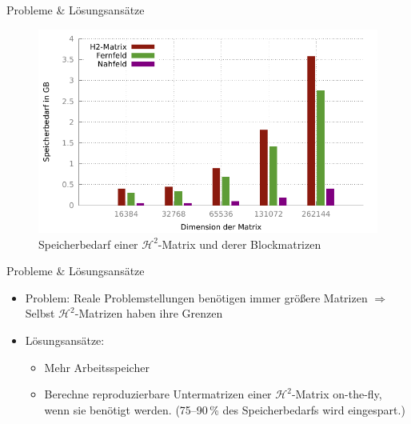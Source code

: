 \documentclass[10pt]{beamer}
\begin{document}
\begin{frame}{Probleme \& Lösungsansätze}
  \begin{figure}
    \includegraphics[width=\linewidth]{figures/fg-memory-h2-nf-ff.pdf}
    \caption{Speicherbedarf einer \(\mathcal{H}^2\)-Matrix und derer 
             Blockmatrizen}
  \end{figure}
\end{frame}

\begin{frame}{Probleme \& Lösungsansätze}
  \begin{itemize}
    \item Problem: Reale Problemstellungen benötigen immer größere Matrizen
          \(\Rightarrow\) Selbst \(\mathcal{H}^2\)-Matrizen haben ihre Grenzen
    \item Lösungsansätze:
    \begin{itemize}
      \item Mehr Arbeitsspeicher
      \item Berechne reproduzierbare Untermatrizen einer
            \(\mathcal{H}^2\)-Matrix on-the-fly, wenn sie benötigt werden.
            (75--90\,\% des Speicherbedarfs wird eingespart.)
    \end{itemize}
  \end{itemize}
\end{frame}
\end{document}
